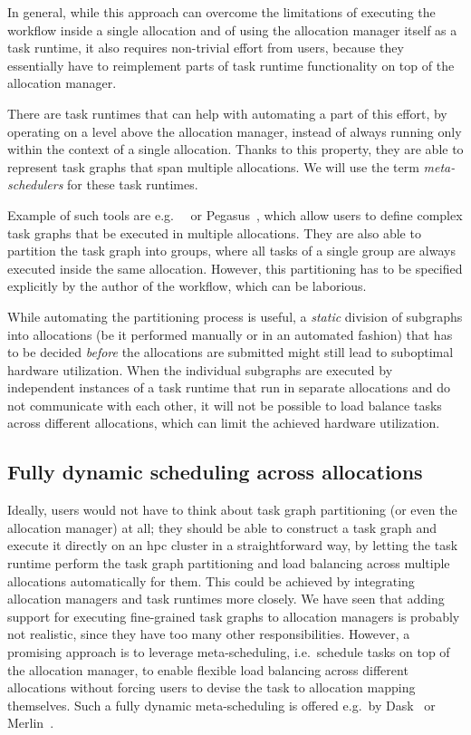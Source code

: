 In general, while this approach can overcome the limitations of executing the workflow inside a
single allocation and of using the allocation manager itself as a task runtime, it also requires
non-trivial effort from users, because they essentially have to reimplement parts of task runtime
functionality on top of the allocation manager.


There are task runtimes that can help with automating a part of this effort, by operating on a
level above the allocation manager, instead of always running only within the context of a single
allocation. Thanks to this property, they are able to represent task graphs that span multiple
allocations. We will use the term \emph{meta-schedulers} for these task runtimes.

Example of such tools are e.g.\ \snakemake~\cite{snakemake} or
Pegasus~\cite{pegasus}, which allow users to define complex task graphs that be
executed in multiple allocations. They are also able to partition the task graph into groups, where
all tasks of a single group are always executed inside the same allocation. However, this
partitioning has to be specified explicitly by the author of the workflow, which can be laborious.

While automating the partitioning process is useful, a \emph{static} division of
subgraphs into allocations (be it performed manually or in an automated fashion) that has to be
decided \emph{before} the allocations are submitted might still lead to suboptimal
hardware utilization. When the individual subgraphs are executed by independent instances of a task
runtime that run in separate allocations and do not communicate with each other, it will not be
possible to load balance tasks across different allocations, which can limit the achieved hardware
utilization.

\subsection*{Fully dynamic scheduling across allocations}
Ideally, users would not have to think about task graph partitioning (or even the allocation
manager) at all; they should be able to construct a task graph and execute it directly on an
\gls{hpc} cluster in a straightforward way, by letting the task runtime perform
the task graph partitioning and load balancing across multiple allocations automatically for them.
This could be achieved by integrating allocation managers and task runtimes more closely. We have
seen that adding support for executing fine-grained task graphs to allocation managers is probably
not realistic, since they have too many other responsibilities. However, a promising approach is to
leverage meta-scheduling, i.e.\ schedule tasks on top of the allocation manager, to enable flexible
load balancing across different allocations without forcing users to devise the task to allocation
mapping themselves. Such a fully dynamic meta-scheduling is offered e.g.\ by
Dask~\cite{dask-jobqueue} or Merlin~\cite{merlin}.

